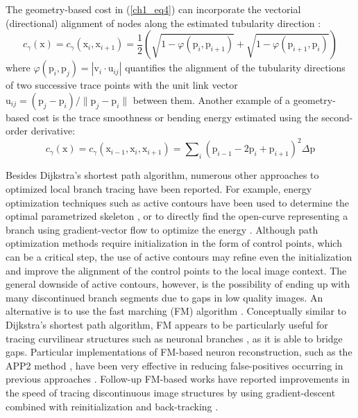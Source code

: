 The geometry-based cost in (\ref{ch1_eq4}) can incorporate the vectorial (directional) alignment of nodes along the estimated tubularity direction \cite{meijering2004design}:
\begin{equation}
c_{\gamma}(\mathrm{x}) = c_{\gamma}(\mathrm{x}_{i}, \mathrm{x}_{i+1}) = \frac{1}{2} \left( \sqrt{1 - \varphi(\mathrm{p}_i, \mathrm{p}_{i+1})} + \sqrt{1 - \varphi(\mathrm{p}_{i+1}, \mathrm{p}_{i})} \right) 
\end{equation}
where $\varphi( \mathrm{p}_{i}, \mathrm{p}_{j} ) = | \mathrm{v}_i \cdot \mathrm{u}_{ij} | $ quantifies the alignment of the tubularity directions of two successive trace points with the unit link vector $\mathrm{u}_{ij} = (\mathrm{p}_j - \mathrm{p}_i) / \lVert \mathrm{p}_j - \mathrm{p}_i \rVert $ between them. Another example of a geometry-based cost is the trace smoothness \cite{peng2010automatic} or bending energy \cite{radojevic2016fuzzy} estimated using the second-order derivative:
\begin{equation}
c_{\gamma}(\mathrm{x}) = c_{\gamma}(\mathrm{x}_{i-1}, \mathrm{x}_{i}, \mathrm{x}_{i+1}) = \sum\nolimits_{i} (\mathrm{p}_{i-1} - 2\mathrm{p}_i + \mathrm{p}_{i+1})^2 \Delta\mathrm{p}
\end{equation}

Besides Dijkstra's shortest path algorithm, numerous other approaches to optimized local branch tracing have been reported. For example, energy optimization techniques such as active contours have been used to determine the optimal parametrized skeleton \cite{schmitt2004new}, or to directly find the open-curve representing a branch using gradient-vector flow to optimize the energy \cite{wang2011broadly}. Although path optimization methods require initialization in the form of control points, which can be a critical step, the use of active contours may refine even the initialization and improve the alignment of the control points to the local image context. The general downside of active contours, however, is the possibility of ending up with many discontinued branch segments due to gaps in low quality images. An alternative is to use the fast marching (FM) algorithm \cite{sethian1999level}. Conceptually similar to Dijkstra's shortest path algorithm, FM appears to be particularly useful for tracing curvilinear structures such as neuronal branches \cite{xiao2013app2, peng2011automatic, mukherjee2012automated, van2007subvoxel, santamaria2015automatic, basu2014reconstructing}, as it is able to bridge gaps. Particular implementations of FM-based neuron reconstruction, such as the APP2 method \cite{xiao2013app2}, have been very effective in reducing false-positives occurring in previous approaches \cite{van2007subvoxel, peng2011automatic}. Follow-up FM-based works have reported improvements in the speed of tracing discontinuous image structures by using gradient-descent combined with reinitialization \cite{mukherjee2012automated} and back-tracking \cite{liu2016rivulet}.

